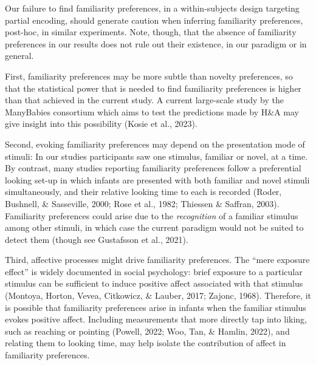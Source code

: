 \documentclass[10pt, letterpaper]{article}
\begin{document}
Our failure to find familiarity preferences, in a within-subjects design
targeting partial encoding, should generate caution when inferring
familiarity preferences, post-hoc, in similar experiments. Note, though,
that the absence of familiarity preferences in our results does not rule
out their existence, in our paradigm or in general.

First, familiarity preferences may be more subtle than novelty
preferences, so that the statistical power that is needed to find
familiarity preferences is higher than that achieved in the current
study. A current large-scale study by the ManyBabies consortium which
aims to test the predictions made by H\&A may give insight into this
possibility (Kosie et al., 2023).

Second, evoking familiarity preferences may depend on the presentation
mode of stimuli: In our studies participants saw one stimulus, familiar
or novel, at a time. By contrast, many studies reporting familiarity
preferences follow a preferential looking set-up in which infants are
presented with both familiar and novel stimuli simultaneously, and their
relative looking time to each is recorded (Roder, Bushnell, \&
Sasseville, 2000; Rose et al., 1982; Thiessen \& Saffran, 2003).
Familiarity preferences could arise due to the \emph{recognition} of a
familiar stimulus among other stimuli, in which case the current
paradigm would not be suited to detect them (though see Gustafsson et
al., 2021).

Third, affective processes might drive familiarity preferences. The
``mere exposure effect'' is widely documented in social psychology:
brief exposure to a particular stimulus can be sufficient to induce
positive affect associated with that stimulus (Montoya, Horton, Vevea,
Citkowicz, \& Lauber, 2017; Zajonc, 1968). Therefore, it is possible
that familiarity preferences arise in infants when the familiar stimulus
evokes positive affect. Including measurements that more directly tap
into liking, such as reaching or pointing (Powell, 2022; Woo, Tan, \&
Hamlin, 2022), and relating them to looking time, may help isolate the
contribution of affect in familiarity preferences.
\end{document}
